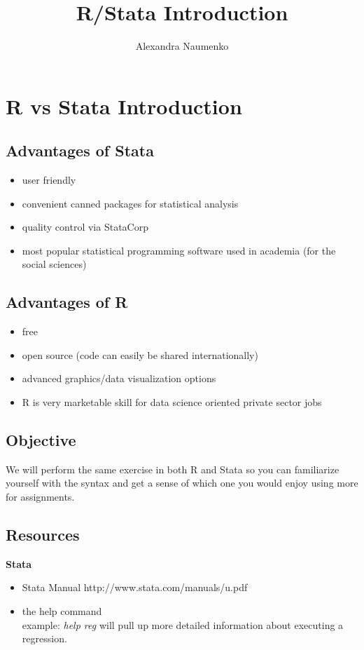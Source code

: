 \documentclass[12pt]{article}%
\begin{document}
\title{R/Stata Introduction}
\author{Alexandra Naumenko}
\date{}
\maketitle
\section{R vs Stata Introduction} 

\subsection{Advantages of Stata}

\begin{itemize}
\item user friendly
\item convenient canned packages for statistical analysis
\item quality control via StataCorp
\item most popular statistical programming software used in academia (for the social sciences)
\end{itemize}

\subsection{Advantages of R}

\begin{itemize}
\item free 
\item open source (code can easily be shared internationally)
\item advanced graphics/data visualization options
\item R is very marketable skill for data science oriented private sector jobs
\end{itemize}

\subsection{Objective}
We will perform the same exercise in both R and Stata so you can familiarize yourself with the syntax and get a sense of which one you would enjoy using more for assignments. 

\subsection{Resources}
\textbf{Stata}
\begin{itemize}
\item Stata Manual http://www.stata.com/manuals/u.pdf
\item the help command \\ example: \textit{help reg} will pull up more detailed information about executing a regression.
\end{itemize}
\end{document}

